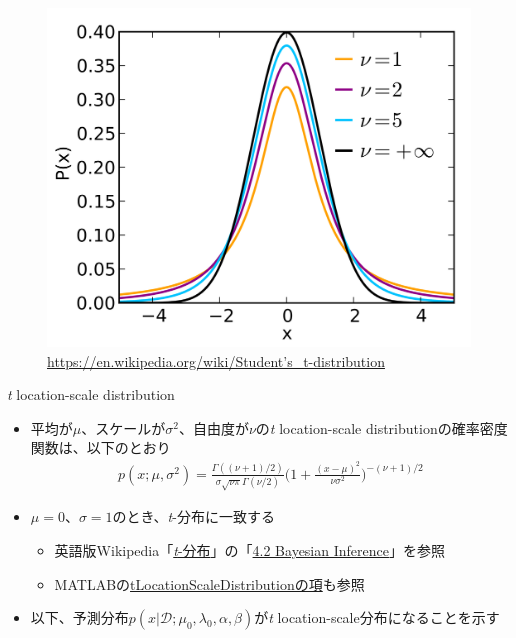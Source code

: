 \documentclass[aspectratio=169,unicode,dvipdfmx,14pt]{beamer}
\begin{document}
\begin{frame}{}
\begin{figure}[htbp]
\begin{center}
\includegraphics[scale=.093]{Student_t_pdf.jpg}
\vspace{-.1in}
\caption{\href{https://en.wikipedia.org/wiki/Student's_t-distribution}{https://en.wikipedia.org/wiki/Student's\_t-distribution}}
\label{}
\end{center}
\end{figure}
\end{frame}


\begin{frame}{\textit{t} location-scale distribution}
\begin{itemize}
\item 平均が$\mu$、スケールが$\sigma^2$、自由度が$\nu$の\textit{t} location-scale distributionの確率密度関数は、以下のとおり
\begin{align}
p(x;\mu,\sigma^2) =\frac{\Gamma((\nu+1)/2)}{\sigma\sqrt{\nu\pi}\Gamma(\nu/2)} \bigg( 1 + \frac{(x - \mu)^2}{\nu\sigma^2} \bigg)^{ - (\nu+1) / 2 }
\end{align}
\item $\mu=0$、$\sigma=1$のとき、\textit{t}-分布に一致する
\begin{itemize}
\item 英語版Wikipedia「\href{https://en.wikipedia.org/wiki/Student's_t-distribution}{\textit{t}-分布}」の「\href{https://en.wikipedia.org/wiki/Student's_t-distribution\#Bayesian_inference}{4.2 Bayesian Inference}」を参照
\item MATLABの\href{https://www.mathworks.com/help/stats/prob.tlocationscaledistribution.html}{tLocationScaleDistributionの項}も参照
\end{itemize}
\item 以下、予測分布$p(x|\mathcal{D};\mu_0,\lambda_0,\alpha,\beta)$が\textit{t} location-scale分布になることを示す
\end{itemize}
\end{frame}
\end{document}
